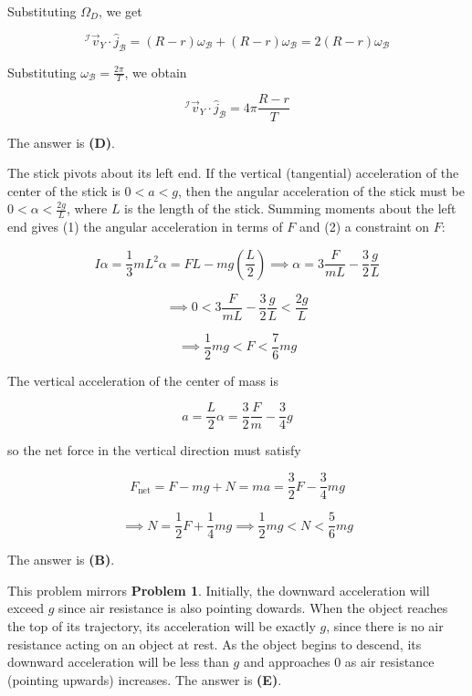 \documentclass[12pt]{article}
\begin{document}
Substituting $\Omega_D$, we get

$$^\mathcal{I} \vec{v}_Y \cdot \hat{j}_\mathcal{B} = (R - r) \omega_\mathcal{B} + (R - r) \omega_\mathcal{B} = 2 (R - r) \omega_\mathcal{B}$$

Substituting $\omega_\mathcal{B} = \frac{2 \pi}{T}$, we obtain

$$^\mathcal{I} \vec{v}_Y \cdot \hat{j}_\mathcal{B} = 4 \pi \frac{R - r}{T}$$

The answer is \textbf{(D)}.


\vspace{2 \baselineskip}



The stick pivots about its left end. If the vertical (tangential) acceleration of the center of the stick is $0 < a < g$, then the angular acceleration of the stick must be $0 < \alpha < \frac{2 g}{L}$, where $L$ is the length of the stick. Summing moments about the left end gives (1) the angular acceleration in terms of $F$ and (2) a constraint on $F$:

$$I \alpha = \frac{1}{3} m L^2 \alpha = F L - m g \left( \frac{L}{2} \right) \implies \alpha = 3 \frac{F}{m L} - \frac{3}{2} \frac{g}{L}$$

$$\implies 0 < 3 \frac{F}{m L} - \frac{3}{2} \frac{g}{L} < \frac{2 g}{L}$$

$$\implies \frac{1}{2} m g < F < \frac{7}{6} m g$$

The vertical acceleration of the center of mass is

$$a = \frac{L}{2} \alpha = \frac{3}{2} \frac{F}{m} - \frac{3}{4} g$$

so the net force in the vertical direction must satisfy

$$F_\text{net} = F - m g + N = m a = \frac{3}{2} F - \frac{3}{4} m g$$

$$\implies N = \frac{1}{2} F + \frac{1}{4} m g \implies \frac{1}{2} m g < N < \frac{5}{6} m g$$

The answer is \textbf{(B)}.


\vspace{2 \baselineskip}



This problem mirrors \textbf{Problem 1}. Initially, the downward acceleration will exceed $g$ since air resistance is also pointing dowards. When the object reaches the top of its trajectory, its acceleration will be exactly $g$, since there is no air resistance acting on an object at rest. As the object begins to descend, its downward acceleration will be less than $g$ and approaches $0$ as air resistance (pointing upwards) increases. The answer is \textbf{(E)}.
\end{document}
